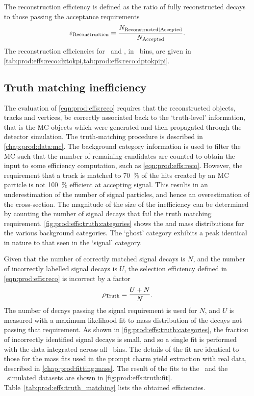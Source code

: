 The reconstruction efficiency is defined as the ratio of fully reconstructed 
decays to those passing the acceptance requirements
\begin{equation}
  \effreco = \frac{%
    N_{\text{Reconstructed}|\text{Accepted}}
  }
  {%
    N_{\text{\text{Accepted}}}
  }.
  \label{eqn:prod:effs:reco}
\end{equation}
The reconstruction efficiencies for \DzToKpi\ and \DpToKpipi, in \pTy\ bins, are 
given in \cref{tab:prod:effs:reco:dztokpi,tab:prod:effs:reco:dptokpipi}.

\subsection{Truth matching inefficiency}
\label{chap:prod:effs:truth}

The evaluation of \cref{eqn:prod:effs:reco} requires that the reconstructed objects, tracks and vertices, be correctly associated back to the `truth-level' information, that is the \ac{MC} objects which were generated and then propagated through the detector simulation.
The truth-matching procedure is described in \cref{chap:prod:data:mc}.
The background category information is used to filter the \ac{MC} such that the 
number of remaining candidates are counted to obtain the input to some 
efficiency computation, such as \cref{eqn:prod:effs:reco}.
However, the requirement that a track is matched to \SI{70}{\percent} of the hits created by an \ac{MC} particle is not \SI{100}{\percent} efficient at accepting signal.
This results in an underestimation of the number of signal particles, and hence an overestimation of the cross-section.
The magnitude of the size of the inefficiency can be determined by counting the 
number of signal decays that fail the truth matching requirement.
\cref{fig:prod:effs:truth:categories} shows the \PDzero and \PDplus mass 
distributions for the various background categories.
The `ghost' category exhibits a peak identical in nature to that seen in the 
`signal' category.

Given that the number of correctly matched signal decays is $N$, and the number 
of incorrectly labelled signal decays is $U$, the selection efficiency defined 
in \cref{eqn:prod:effs:reco} is incorrect by a factor
\begin{equation}
  \rho_{\textnormal{Truth}} = \frac{U+N}{N}.
  \label{eqn:prod:effs:truth}
\end{equation}
The number of decays passing the signal requirement is used for $N$, and $U$ is 
measured with a maximum likelihood fit to mass distribution of the decays not 
passing that requirement.
As shown in \cref{fig:prod:effs:truth:categories}, the fraction of incorrectly 
identified signal decays is small, and so a single fit is performed with the 
data integrated across all \pTy\ bins.
The details of the fit are identical to those for the mass fits used in the 
prompt charm yield extraction with real data, described in 
\cref{chap:prod:fitting:mass}.
The result of the fits to the \DzToKpi\ and the \DpToKpipi\ simulated datasets 
are shown in \cref{fig:prod:effs:truth:fit}.
Table~\ref{tab:prod:effs:truth_matching} lists the obtained efficiencies.

